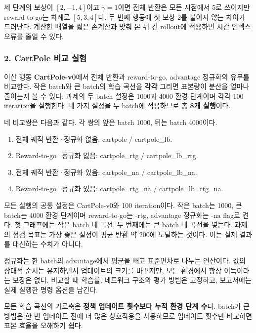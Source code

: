 \documentclass[11pt,a4paper]{article}
\begin{document}
세 단계의 보상이 $[2,-1,4]$이고 $\gamma=1$이면 전체 반환은 모든 시점에서 5로 쓰이지만 reward-to-go는 차례로 $[5,3,4]$다. 두 번째 행동에 첫 보상 2를 붙이지 않는 차이가 드러난다. 계산한 배열을 짧은 손계산과 맞춰 본 뒤 긴 rollout에 적용하면 시간 인덱스 오류를 줄일 수 있다.\par

\subsubsection{2. CartPole 비교 실험}

이산 행동 \textbf{CartPole-v0}에서 전체 반환과 reward-to-go, advantage 정규화의 유무를 비교한다. 작은 batch와 큰 batch의 학습 곡선을 \textbf{각각} 그리면 표본량이 분산을 얼마나 줄이는지 볼 수 있다. 과제의 두 batch 설정은 1000과 4000 환경 단계이며 각각 100 iteration을 실행한다. 네 가지 설정을 두 batch에 적용하므로 총 \textbf{8개 실행}이다.\par

네 비교쌍은 다음과 같다. 각 쌍의 앞은 batch 1000, 뒤는 batch 4000이다.\par

\begin{enumerate}
\item 전체 궤적 반환·정규화 없음: cartpole / cartpole\_lb.
\item Reward-to-go·정규화 없음: cartpole\_rtg / cartpole\_lb\_rtg.
\item 전체 궤적 반환·정규화 있음: cartpole\_na / cartpole\_lb\_na.
\item Reward-to-go·정규화 있음: cartpole\_rtg\_na / cartpole\_lb\_rtg\_na.
\end{enumerate}

모든 실행의 공통 설정은 CartPole-v0와 100 iteration이다. 작은 batch는 1000, 큰 batch는 4000 환경 단계이며 reward-to-go는 -rtg, advantage 정규화는 -na flag로 켠다. 첫 그래프에는 작은 batch 네 곡선, 두 번째에는 큰 batch 네 곡선을 넣는다. 과제의 점검 목표는 가장 좋은 설정이 평균 반환 약 200에 도달하는 것이다. 이는 실제 결과를 대신하는 수치가 아니다.\par

정규화는 한 batch의 advantage에서 평균을 빼고 표준편차로 나누는 연산이다. 값의 상대적 순서는 유지하면서 업데이트의 크기를 바꾸지만, 모든 환경에서 항상 이득이라는 보장은 없다. 비교할 때 학습률, 네트워크 구조와 평가 방법은 고정하고, 보고서에는 실제 실행한 명령 옵션을 남긴다.\par

모든 학습 곡선의 가로축은 \textbf{정책 업데이트 횟수보다 누적 환경 단계 수}다. batch가 큰 방법은 한 번 업데이트 전에 더 많은 상호작용을 사용하므로 업데이트 횟수만 비교하면 표본 효율을 오해하기 쉽다.\par
\end{document}
